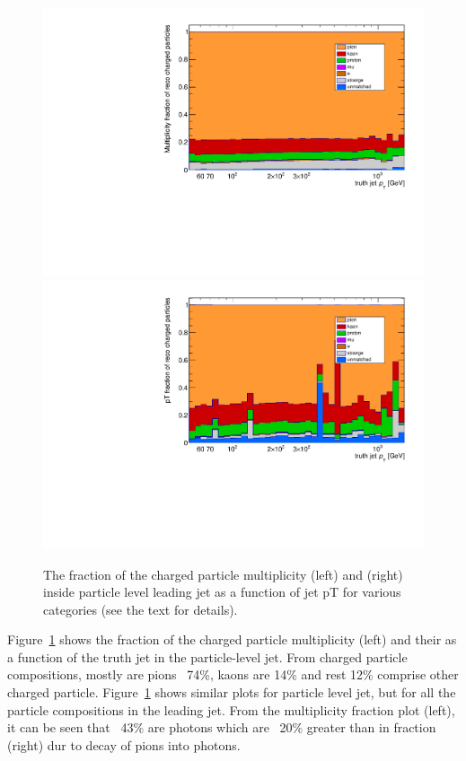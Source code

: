 \begin{figure}
\centering
\includegraphics[scale=0.3, page=2]{figures/jet_comp_study_powheg_Tight_MultiplicityFraction.pdf}
\hspace{2mm}
\includegraphics[scale=0.3, page=2]{figures/jet_comp_study_powheg_Tight_pTFraction.pdf}
\caption {The fraction of the charged particle multiplicity (left) and \pT (right) inside particle level leading jet as a function of jet pT for various categories (see the text for details).}
\label{fig:fraction of charged particles in truth jet}
\end{figure}

Figure~\ref{fig:fraction of charged particles in truth jet} shows the fraction of the charged particle multiplicity (left) and their \pT  as a function of the truth jet \pT in the particle-level jet. From charged particle compositions, mostly are pions ~74\%, kaons are 14\% and rest 12\% comprise other charged particle.
Figure~\ref{fig:fraction of charged particles in truth jet} shows similar plots for particle level jet, but for all the particle compositions in the leading jet. From the multiplicity fraction plot (left), it can be seen that ~43\% are photons which are ~20\% greater than in \pt fraction (right) dur to decay of pions into photons.

